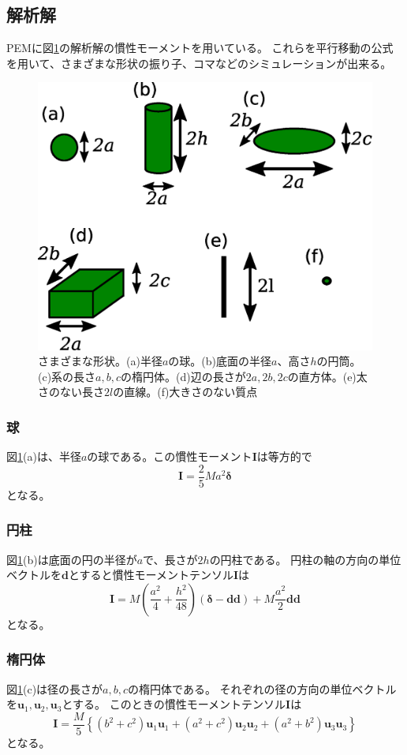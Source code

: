 \documentclass[a4paper,11pt]{jbook}
\begin{document}
\subsection{解析解}
PEMに図\ref{fig:3_2_2_shapes}の解析解の慣性モーメントを用いている。
これらを平行移動の公式を用いて、さまざまな形状の振り子、コマなどのシミュレーションが出来る。
\begin{figure}[h]
\centering
  \includegraphics[clip,width=0.8\linewidth]{pict/3_2_2_shapes.eps}
  \caption{さまざまな形状。(a)半径$a$の球。(b)底面の半径$a$、高さ$h$の円筒。(c)系の長さ$a,b,c$の楕円体。(d)辺の長さが$2a,2b,2c$の直方体。(e)太さのない長さ$2l$の直線。(f)大きさのない質点  }
  \label{fig:3_2_2_shapes}
\end{figure}
\subsubsection{球}
図\ref{fig:3_2_2_shapes}(a)は、半径$a$の球である。この慣性モーメント$\bm{I}$は等方的で
\begin{equation}
\bm{I}=\frac25Ma^2\bm{\delta}
\label{eq:inertia_sphere}
\end{equation}
となる。
\subsubsection{円柱}
図\ref{fig:3_2_2_shapes}(b)は底面の円の半径が$a$で、長さが$2h$の円柱である。
円柱の軸の方向の単位ベクトルを$\bm{d}$とすると慣性モーメントテンソル$\bm{I}$は
\begin{equation}
\bm{I}=M\left(\frac{a^2}{4}+\frac{h^2}{48}\right)\left(\bm{\delta}-\bm{d}\bm{d}\right)+M\frac{a^2}{2}\bm{d}\bm{d}
\label{eq:inertia_cylinder}
\end{equation}
となる。
\subsubsection{楕円体}
図\ref{fig:3_2_2_shapes}(c)は径の長さが$a,b,c$の楕円体である。
それぞれの径の方向の単位ベクトルを$\bm{u}_1,\bm{u}_2,\bm{u}_3$とする。
このときの慣性モーメントテンソル$\bm{I}$は
\begin{equation}
\bm{I}=\frac{M}{5}\left\{\left(b^2+c^2\right)\bm{u}_1\bm{u}_1 
+\left(a^2+c^2\right)\bm{u}_2\bm{u}_2
+\left(a^2+b^2\right)\bm{u}_3\bm{u}_3
 \right\}
\end{equation}
となる。
\end{document}

